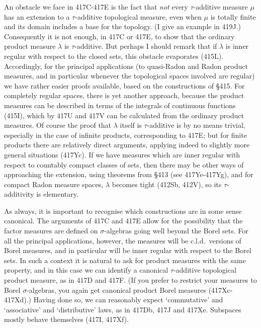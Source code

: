 {An obstacle we face in 417C-417E is the fact that {\it not} every
$\tau$-additive measure $\mu$ has an extension to a $\tau$-additive
topological measure, even when $\mu$ is totally finite and its domain
includes a base for the topology.   (I give an example in 419J.)
Consequently it is not enough, in 417C or 417E, to show that the
ordinary product measure $\lambda$ is $\tau$-additive.   But perhaps I
should remark that if $\lambda$ is inner regular with respect to the
closed sets, this obstacle evaporates (415L).   Accordingly, for the
principal applications (to quasi-Radon and Radon product measures, and
in particular whenever the topological spaces involved are regular) we
have rather easier proofs available, based on the constructions of
\S415.   For completely regular spaces, there is yet another approach,
because the product measures can be described in terms of the integrals
of continuous functions (415I), which by 417U and 417V can be
calculated from the ordinary product measures.   Of course
the proof that $\lambda$ itself is $\tau$-additive is by no means
trivial, especially in the case of infinite products, corresponding to
417E;  but for finite products there are relatively direct arguments,
applying indeed to slightly more general situations (417Yc).   If we
have measures which are inner regular with respect to countably compact
classes of sets, then there may be other ways of approaching the
extension, using theorems from \S413
(see 417Ye-417Yg), %
and for compact Radon measure spaces, $\lambda$ becomes tight (412Sb,
412V), so its $\tau$-additivity is elementary.

As always, it is important to recognise which constructions are in some
sense canonical.   The arguments of 417C and 417E allow for the
possibility that the factor measures are defined on $\sigma$-algebras
going well beyond the Borel sets.   For all the principal applications,
however, the measures
will be c.l.d.\ versions of Borel measures, and in particular will be
inner regular with respect to the Borel sets.   In such a context it is
natural to ask for product measures with the same property, and in this
case we can identify a canonical $\tau$-additive topological product
measure, as in 417D and 417F.   (If you prefer to restrict your measures
to Borel $\sigma$-algebras, you again get canonical product Borel
measures (417Xc-417Xd).)   Having done so, we can reasonably expect
`commutative' and `associative' and
`distributive' laws, as in 417Db, 417J and 417Xe.   Subspaces mostly
behave themselves (417I, 417Xf).

}
